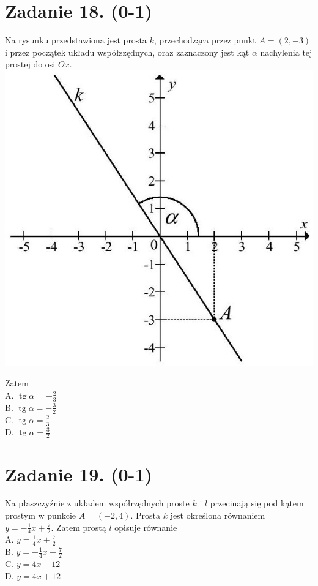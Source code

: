 \documentclass[10pt]{article}
\begin{document}
\section*{Zadanie 18. (0-1)}
Na rysunku przedstawiona jest prosta \(k\), przechodząca przez punkt \(A=(2,-3)\) i przez początek układu współzzędnych, oraz zaznaczony jest kąt \(\alpha\) nachylenia tej prostej do osi \(O x\).\\
\includegraphics[max width=\textwidth, center]{2024_11_21_7b5527312ea89ae66fd0g-12}

Zatem\\
A. \(\operatorname{tg} \alpha=-\frac{2}{3}\)\\
B. \(\operatorname{tg} \alpha=-\frac{3}{2}\)\\
C. \(\operatorname{tg} \alpha=\frac{2}{3}\)\\
D. \(\operatorname{tg} \alpha=\frac{3}{2}\)

\section*{Zadanie 19. (0-1)}
Na płaszczyźnie z układem współrzędnych proste \(k\) i \(l\) przecinają się pod kątem prostym w punkcie \(A=(-2,4)\). Prosta \(k\) jest określona równaniem \(y=-\frac{1}{4} x+\frac{7}{2}\). Zatem prostą \(l\) opisuje równanie\\
A. \(y=\frac{1}{4} x+\frac{7}{2}\)\\
B. \(y=-\frac{1}{4} x-\frac{7}{2}\)\\
C. \(y=4 x-12\)\\
D. \(y=4 x+12\)
\end{document}
